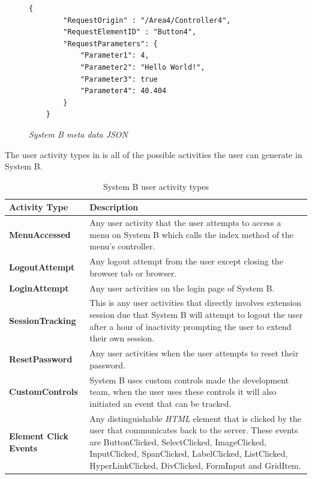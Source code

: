 \begin{figure}[!htb]
	\centering
	\begin{lstlisting}[style=json] 
	{
		"RequestOrigin" : "/Area4/Controller4",
		"RequestElementID" : "Button4",
		"RequestParameters": {
			"Parameter1": 4,
			"Parameter2": "Hello World!",
			"Parameter3": true
			"Parameter4": 40.404
		}
	}
	\end{lstlisting}
	\caption[System B meta data JSON]
	{\textit{System B meta data JSON}}\label{fig:CH2_SystemBMetaData}
\end{figure}

\clearpage

The user activity types in  is all of the possible activities the user can generate in System B. 

\begin{table}[!htb]
	\centering
	\small
	\caption[System B user activity types]
	{System B user activity types}
	\label{tbl:Ch2_SystemB_ActivityTypes}
	\begin{tabularx}{\textwidth}{|l|X|}
		\hline \textbf{Activity Type} & \textbf{Description} \\
		\hline \textbf{MenuAccessed} & Any user activity that the user attempts to access a menu on System B which calls the index method of the menu's controller. \\
		\hline \textbf{LogoutAttempt} & Any logout attempt from the user except closing the browser tab or browser. \\
		\hline \textbf{LoginAttempt} & Any user activities on the login page of System B.\\
		\hline \textbf{SessionTracking} & This is any user activities that directly involves extension session due that System B will attempt to logout the user after a hour of inactivity prompting the user to extend their own session.\\
		\hline \textbf{ResetPassword} & Any user activities when the user attempts to reset their password. \\
		\hline \textbf{CustomControls} & System B uses custom controls made the development team, when the user uses these controls it will also initiated an event that can be tracked. \\ 
		\hline \textbf{Element Click Events} & Any distinguishable \emph{HTML} element that is clicked by the user that communicates back to the server. These events are ButtonClicked, SelectClicked, ImageClicked, InputClicked, SpanClicked, LabelClicked, ListClicked, HyperLinkClicked, DivClicked, FormInput and GridItem.\\
		\hline
	\end{tabularx}
\end{table}

